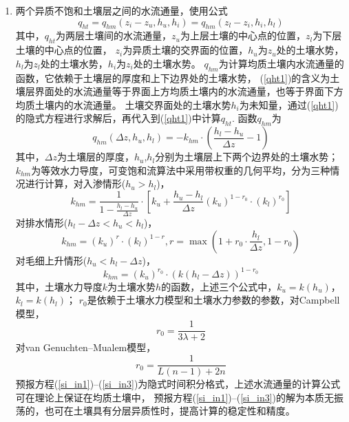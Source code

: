\begin{enumerate}
    \item 两个异质不饱和土壤层之间的水流通量，使用公式
    \begin{equation}\label{qht1}
        q_{h t}=q_{h m}\left(z_{i}-z_{u}, h_{u}, h_{i}\right)=q_{h m}\left(z_{l}-z_{i}, h_{i}, h_{l}\right)
        \end{equation}
        其中，$q_{ht}$为两层土壤间的水流通量，$z_u$为上层土壤的中心点的位置，$z_l$为下层土壤的中心点的位置，
        $z_i$为异质土壤的交界面的位置，$h_u$为$z_u$处的土壤水势，$h_l$为$z_l$处的土壤水势，$h_i$为$z_i$处的土壤水势。
        $q_{hm}$为计算均质土壤内水流通量的函数，它依赖于土壤层的厚度和上下边界处的土壤水势，
        (\ref{qht1})的含义为土壤层界面处的水流通量等于界面上方均质土壤内的水流通量，也等于界面下方均质土壤内的水流通量。
        土壤交界面处的土壤水势$h_i$为未知量，通过(\ref{qht1})的隐式方程进行求解后，再代入到(\ref{qht1})中计算$q_{ht}$. 函数$q_{hm}$为
        \begin{equation}
        q_{h m}\left(\Delta z, h_{u}, h_{l}\right)=-k_{h m} \cdot\left(\frac{h_{l}-h_{u}}{\Delta z}-1\right)
        \end{equation}
        其中，$\Delta z$为土壤层的厚度，$h_u$,$h_l$分别为土壤层上下两个边界处的土壤水势；
        $k_{hm}$为等效水力导度，可变饱和流算法中采用带权重的几何平均，分为三种情况进行计算，对入渗情形($h_u>h_l$)，
        \begin{equation}
        k_{h m}=\frac{1}{1-\frac{h_{l}-h_{u}}{\Delta z}} \cdot\left[k_{u}+\frac{h_{u}-h_{l}}{\Delta z}\left(k_{u}\right)^{1-r_{0}} \cdot\left(k_{l}\right)^{r_{0}}\right]
        \end{equation}
        对排水情形($h_l-\Delta z<h_u<h_l$)，
        \begin{equation}
        k_{h m}=\left(k_{u}\right)^{r} \cdot\left(k_{l}\right)^{1-r}, r=\max \left(1+r_{0} \cdot \frac{h_{l}}{\Delta z}, 1-r_{0}\right)
        \end{equation}
        对毛细上升情形($h_u<h_l-\Delta z$)，
        \begin{equation}
        k_{h m}=\left(k_{u}\right)^{r_{0}} \cdot\left(k\left(h_{l}-\Delta z\right)\right)^{1-r_{0}}
        \end{equation}
        其中，土壤水力导度$k$为土壤水势$h$的函数，上述三个公式中，$k_u=k(h_u )$，$k_l=k(h_l )$；
        $r_0$是依赖于土壤水力模型和土壤水力参数的参数，对Campbell模型，
        \begin{equation}
        r_{0}=\frac{1}{3 \lambda+2}
        \end{equation}
        对van Genuchten--Mualem模型，
        \begin{equation}
        r_{0}=\frac{1}{L(n-1)+2 n}
        \end{equation}
        预报方程(\ref{si_in1})--(\ref{si_in3})为隐式时间积分格式，上述水流通量的计算公式可在理论上保证在均质土壤中，
        预报方程(\ref{si_in1})--(\ref{si_in3})的解为本质无振荡的，也可在土壤具有分层异质性时，提高计算的稳定性和精度。


\end{enumerate}
